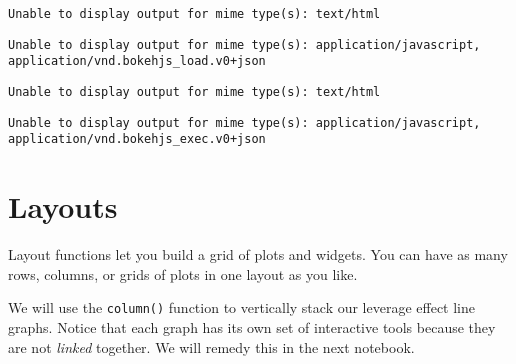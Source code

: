 \documentclass[
  letterpaper,
  DIV=11,
  numbers=noendperiod]{scrreprt}
\begin{document}
\begin{verbatim}
Unable to display output for mime type(s): text/html
\end{verbatim}

\begin{verbatim}
Unable to display output for mime type(s): application/javascript, application/vnd.bokehjs_load.v0+json
\end{verbatim}

\begin{verbatim}
Unable to display output for mime type(s): text/html
\end{verbatim}

\begin{verbatim}
Unable to display output for mime type(s): application/javascript, application/vnd.bokehjs_exec.v0+json
\end{verbatim}

\hypertarget{layouts}{%
\section{Layouts}\label{layouts}}

Layout functions let you build a grid of plots and widgets. You can have
as many rows, columns, or grids of plots in one layout as you like.

We will use the \texttt{column()} function to vertically stack our
leverage effect line graphs. Notice that each graph has its own set of
interactive tools because they are not \emph{linked} together. We will
remedy this in the next notebook.
\end{document}
